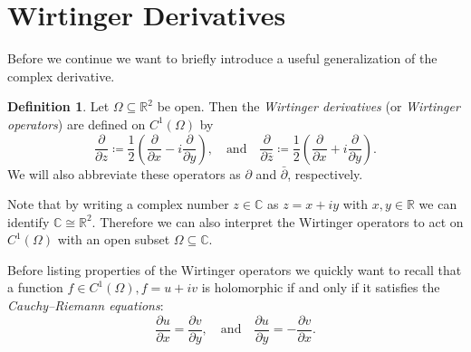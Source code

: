 \documentclass[letterpaper, 11pt]{article}
\newcommand{\R}{\mathbb{R}}
\newcommand{\C}{\mathbb{C}}
\newcommand{\1}{\mathds{1}}
\theoremstyle{definition}
\newtheorem{definition}[theorem]{Definition}
\begin{document}
\section{Wirtinger Derivatives}

Before we continue we want to briefly introduce a useful generalization of the complex derivative.

\begin{definition}
  Let $\Omega \subseteq \R^2$ be open. Then the \emph{Wirtinger derivatives} (or \emph{Wirtinger operators}) are defined on $C^1(\Omega)$ by
  \begin{equation*}
    \frac{\partial}{\partial z} \coloneqq \frac{1}{2} \left( \frac{\partial}{\partial x} - i \frac{\partial}{\partial y} \right), \quad \textrm{and} \quad
    \frac{\partial}{\partial \bar{z}} \coloneqq \frac{1}{2} \left( \frac{\partial}{\partial x} + i \frac{\partial}{\partial y} \right).
  \end{equation*}
  We will also abbreviate these operators as $\partial$ and $\bar{\partial}$, respectively.
\end{definition}

Note that by writing a complex number $z \in \C$ as $z = x + iy$ with $x, y \in \R$ we can identify $\C \cong \R^2$. Therefore we can also interpret the Wirtinger operators to act on $C^1(\Omega)$ with an open subset $\Omega \subseteq \C$.

Before listing properties of the Wirtinger operators we quickly want to recall that a function $f \in C^1(\Omega), f = u + iv$ is holomorphic if and only if it satisfies the \emph{Cauchy--Riemann equations}:
\begin{equation*}
  \frac{\partial u}{\partial x} = \frac{\partial v}{\partial y}, \quad \textrm{and} \quad \frac{\partial u}{\partial y} = -\frac{\partial v}{\partial x}.
\end{equation*}
\end{document}
